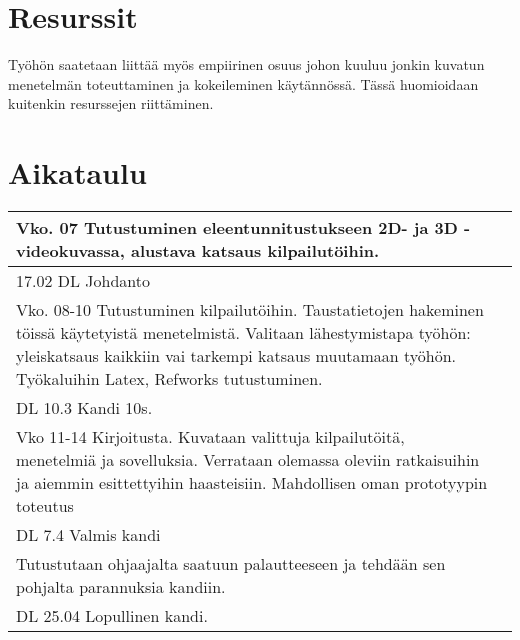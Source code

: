 \documentclass[12pt,a4paper,finnish,oneside]{article}
\begin{document}
\section{Resurssit}


Työhön saatetaan liittää myös empiirinen osuus johon kuuluu jonkin kuvatun menetelmän toteuttaminen ja kokeileminen käytännössä.
Tässä huomioidaan kuitenkin resurssejen riittäminen.

\section{Aikataulu}


\begin{tabular}{|p{170mm}|p{500mm}|}
\hline
Vko. 07 Tutustuminen eleentunnitustukseen 2D- ja 3D -videokuvassa, alustava katsaus kilpailutöihin.  \\ \hline
17.02 DL Johdanto \\ \hline
Vko. 08-10 Tutustuminen kilpailutöihin. Taustatietojen hakeminen töissä käytetyistä menetelmistä. Valitaan lähestymistapa työhön: yleiskatsaus kaikkiin vai tarkempi katsaus muutamaan työhön. Työkaluihin Latex, Refworks tutustuminen. \\ \hline
DL 10.3 Kandi 10s. \\ \hline
Vko 11-14 Kirjoitusta. Kuvataan valittuja kilpailutöitä, menetelmiä ja sovelluksia. Verrataan olemassa oleviin ratkaisuihin ja aiemmin esittettyihin haasteisiin. Mahdollisen oman prototyypin toteutus\\ \hline
DL 7.4 Valmis kandi \\ \hline
Tutustutaan ohjaajalta saatuun palautteeseen ja tehdään sen pohjalta parannuksia kandiin.\\ \hline
DL 25.04 Lopullinen kandi.\\ \hline
\end{tabular}







%


% 

\renewcommand{\refname}{Lähteet}  %



\end{document}
